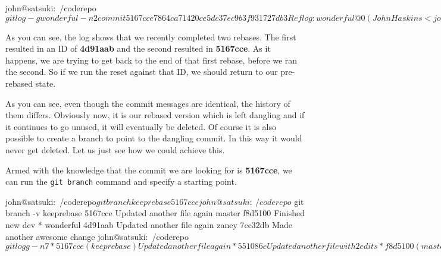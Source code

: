 \begin{code}
john@satsuki:~/coderepo$ git log -g wonderful -n2
commit 5167cce7864ca71420ce5dc37ec9b3f931727db3
Reflog: wonderful@{0} (John Haskins <john.haskins@tamagoyakiinc.koala>)
Reflog message: rebase finished: refs/heads/wonderful onto f8d5100142b43ffaba9bb
Author: John Haskins <john.haskins@tamagoyakiinc.koala>
Date:   Wed Jul 6 09:30:40 2011 +0100

    Updated another file again

commit 4d91aab57aaad020e62486805e25d0d6f06fdc3e
Reflog: wonderful@{1} (John Haskins <john.haskins@tamagoyakiinc.koala>)
Reflog message: rebase -i (finish): refs/heads/wonderful onto 1c3206a
Author: John Haskins <john.haskins@tamagoyakiinc.koala>
Date:   Wed Jul 6 09:30:40 2011 +0100

    Updated another file again
john@satsuki:~/coderepo$ 
\end{code}

As you can see, the log shows that we recently completed two rebases.  The first resulted in an ID of \textbf{4d91aab} and the second resulted in \textbf{5167cce}.  As it happens, we are trying to get back to the end of that first rebase, before we ran the second.  So if we run the reset against that ID, we should return to our pre-rebased state.


As you can see, even though the commit messages are identical, the history of them differs.  Obviously now, it is our rebased version which is left dangling and if it continues to go unused, it will eventually be deleted.  Of course it is also possible to create a branch to point to the dangling commit.  In this way it would never get deleted.  Let us just see how we could achieve this.

Armed with the knowledge that the commit we are looking for is \textbf{5167cce}, we can run the \texttt{git branch} command and specify a starting point.

\begin{code}
john@satsuki:~/coderepo$ git branch keeprebase 5167cce
john@satsuki:~/coderepo$ git branch -v
  keeprebase 5167cce Updated another file again
  master     f8d5100 Finished new dev
* wonderful  4d91aab Updated another file again
  zaney      7cc32db Made another awesome change
john@satsuki:~/coderepo$ git logg -n7
* 5167cce (keeprebase) Updated another file again
* 551086e Updated another file with 2 edits
* f8d5100 (master) Finished new dev
* 1968324 Start new dev
| * 4d91aab (HEAD, wonderful) Updated another file again
| * 1ffe37f Updated another file with 2 edits
|/  
* 1c3206a Added a new file
john@satsuki:~/coderepo$ 
\end{code}

